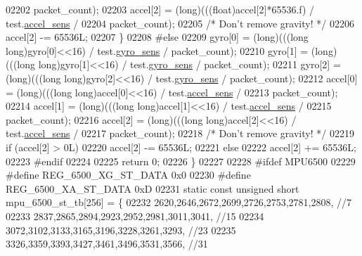 \begin{DoxyCode}
{{{{{{{02202             packet\_count);
02203         accel[2] = (long)(((\textcolor{keywordtype}{float})accel[2]*65536.f) / test.\hyperlink{structtest__s_a22a1d8ebbceb431baa0dfdc911fbc8ab}{accel\_sens} /
02204             packet\_count);
02205         \textcolor{comment}{/* Don't remove gravity! */}
02206         accel[2] -= 65536L;
02207     \}
02208 \textcolor{preprocessor}{#else}
02209     gyro[0] = (long)(((\textcolor{keywordtype}{long} \textcolor{keywordtype}{long})gyro[0]<<16) / test.\hyperlink{structtest__s_a32da1174cf6569aa99bdff70055bb45a}{gyro\_sens} / packet\_count);
02210     gyro[1] = (long)(((\textcolor{keywordtype}{long} \textcolor{keywordtype}{long})gyro[1]<<16) / test.\hyperlink{structtest__s_a32da1174cf6569aa99bdff70055bb45a}{gyro\_sens} / packet\_count);
02211     gyro[2] = (long)(((\textcolor{keywordtype}{long} \textcolor{keywordtype}{long})gyro[2]<<16) / test.\hyperlink{structtest__s_a32da1174cf6569aa99bdff70055bb45a}{gyro\_sens} / packet\_count);
02212     accel[0] = (long)(((\textcolor{keywordtype}{long} \textcolor{keywordtype}{long})accel[0]<<16) / test.\hyperlink{structtest__s_a22a1d8ebbceb431baa0dfdc911fbc8ab}{accel\_sens} /
02213         packet\_count);
02214     accel[1] = (long)(((\textcolor{keywordtype}{long} \textcolor{keywordtype}{long})accel[1]<<16) / test.\hyperlink{structtest__s_a22a1d8ebbceb431baa0dfdc911fbc8ab}{accel\_sens} /
02215         packet\_count);
02216     accel[2] = (long)(((\textcolor{keywordtype}{long} \textcolor{keywordtype}{long})accel[2]<<16) / test.\hyperlink{structtest__s_a22a1d8ebbceb431baa0dfdc911fbc8ab}{accel\_sens} /
02217         packet\_count);
02218     \textcolor{comment}{/* Don't remove gravity! */}
02219     \textcolor{keywordflow}{if} (accel[2] > 0L)
02220         accel[2] -= 65536L;
02221     \textcolor{keywordflow}{else}
02222         accel[2] += 65536L;
02223 \textcolor{preprocessor}{#endif}
02224 
02225     \textcolor{keywordflow}{return} 0;
02226 \}
02227 
02228 \textcolor{preprocessor}{#ifdef MPU6500}
02229 \textcolor{preprocessor}{#define REG\_6500\_XG\_ST\_DATA     0x0}
02230 \textcolor{preprocessor}{#define REG\_6500\_XA\_ST\_DATA     0xD}
02231 \textcolor{keyword}{static} \textcolor{keyword}{const} \textcolor{keywordtype}{unsigned} \textcolor{keywordtype}{short} mpu\_6500\_st\_tb[256] = \{
02232     2620,2646,2672,2699,2726,2753,2781,2808, \textcolor{comment}{//7}
02233     2837,2865,2894,2923,2952,2981,3011,3041, \textcolor{comment}{//15}
02234     3072,3102,3133,3165,3196,3228,3261,3293, \textcolor{comment}{//23}
02235     3326,3359,3393,3427,3461,3496,3531,3566, \textcolor{comment}{//31}
}}}}}}}
\end{DoxyCode}
